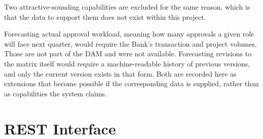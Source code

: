 Two attractive-sounding capabilities are excluded for the same reason, which is that the data to support them does not exist within this project.

Forecasting actual approval workload, meaning how many approvals a given role will face next quarter, would require the Bank's transaction and project volumes. Those are not part of the DAM and were not available. Forecasting revisions to the matrix itself would require a machine-readable history of previous versions, and only the current version exists in that form. Both are recorded here as extensions that become possible if the corresponding data is supplied, rather than as capabilities the system claims.

\section{REST Interface}

